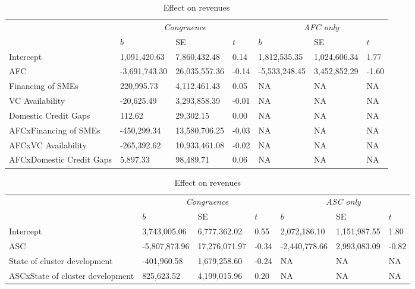 \documentclass[
  english,
  man]{apa6}
\begin{document}
\begin{table}

\caption{\label{tab:unnamed-chunk-24}Effect on revenues}
\centering
\fontsize{8}{10}\selectfont
\begin{tabular}[t]{l|l|l|l|l|l|l}
\hline
\multicolumn{1}{c|}{\em{ }} & \multicolumn{3}{c|}{\em{Congruence}} & \multicolumn{3}{c}{\em{AFC only}} \\
\cline{2-4} \cline{5-7}
  & $b$ & SE & $t$ & $b$ & SE & $t$\\
\hline
Intercept & 1,091,420.63 & 7,860,432.48 & 0.14 & 1,812,535.35 & 1,024,606.34 & 1.77\\
\hline
AFC & -3,691,743.30 & 26,035,557.36 & -0.14 & -5,533,248.45 & 3,452,852.29 & -1.60\\
\hline
Financing of SMEs & 220,995.73 & 4,112,461.43 & 0.05 & NA & NA & NA\\
\hline
VC Availability & -20,625.49 & 3,293,858.39 & -0.01 & NA & NA & NA\\
\hline
Domestic Credit Gaps & 112.62 & 29,302.15 & 0.00 & NA & NA & NA\\
\hline
AFCxFinancing of SMEs & -450,299.34 & 13,580,706.25 & -0.03 & NA & NA & NA\\
\hline
AFCxVC Availability & -265,392.62 & 10,933,461.08 & -0.02 & NA & NA & NA\\
\hline
AFCxDomestic Credit Gaps & 5,897.33 & 98,489.71 & 0.06 & NA & NA & NA\\
\hline
\end{tabular}
\end{table}

\begin{table}

\caption{\label{tab:unnamed-chunk-24}Effect on revenues}
\centering
\fontsize{8}{10}\selectfont
\begin{tabular}[t]{l|l|l|l|l|l|l}
\hline
\multicolumn{1}{c|}{\em{ }} & \multicolumn{3}{c|}{\em{Congruence}} & \multicolumn{3}{c}{\em{ASC only}} \\
\cline{2-4} \cline{5-7}
  & $b$ & SE & $t$ & $b$ & SE & $t$\\
\hline
Intercept & 3,743,005.06 & 6,777,362.02 & 0.55 & 2,072,186.10 & 1,151,987.55 & 1.80\\
\hline
ASC & -5,807,873.96 & 17,276,071.97 & -0.34 & -2,440,778.66 & 2,993,083.09 & -0.82\\
\hline
State of cluster development & -401,960.58 & 1,679,258.60 & -0.24 & NA & NA & NA\\
\hline
ASCxState of cluster development & 825,623.52 & 4,199,015.96 & 0.20 & NA & NA & NA\\
\hline
\end{tabular}
\end{table}
\end{document}
